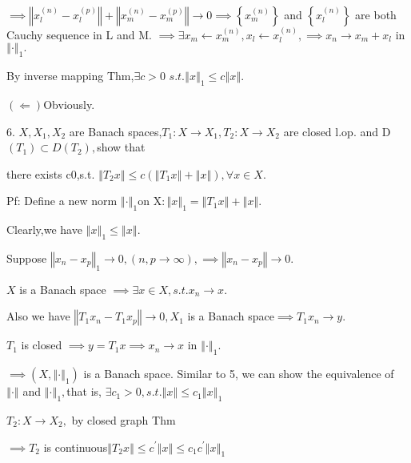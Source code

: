 \documentclass{ctexart}
\begin{document}
$\implies \left\Vert x_{l}^{\left( n\right) }-x_{l}^{\left( p\right)
}\right\Vert +\left\Vert x_{m}^{\left( n\right) }-x_{m}^{\left( p\right)
}\right\Vert \rightarrow 0\implies \left\{ x_{m}^{\left( n\right) }\right\} $
and $\left\{ x_{l}^{\left( n\right) }\right\} $ are both Cauchy sequence in
L and M. $\implies \exists x_{m}\leftarrow x_{m}^{\left( n\right)
},x_{l}\leftarrow x_{l}^{\left( n\right) },\implies x_{n}\rightarrow
x_{m}+x_{l}$ in $\left\Vert \cdot \right\Vert _{1}.$

\bigskip By inverse mapping Thm,$\exists c>0$ $s.t.\left\Vert x\right\Vert
_{1}\leq c\left\Vert x\right\Vert .$

$\left( \Longleftarrow \right) $Obviously.

6. $X,X_{1},X_{2}$ are Banach spaces,$T_{1}:X\rightarrow
X_{1},T_{2}:X\rightarrow X_{2}$ are closed l.op. and D$\left( T_{1}\right)
\subset D\left( T_{2}\right) ,$show that

there exists c\TEXTsymbol{>}0,s.t. $\left\Vert T_{2}x\right\Vert \leq
c\left( \left\Vert T_{1}x\right\Vert +\left\Vert x\right\Vert \right)
,\forall x\in X.$

Pf: Define a new norm $\left\Vert \cdot \right\Vert _{1}$on X$:\left\Vert
x\right\Vert _{1}=\left\Vert T_{1}x\right\Vert +\left\Vert x\right\Vert .$

Clearly,we have $\left\Vert x\right\Vert _{1}\leq \left\Vert x\right\Vert .$

Suppose $\left\Vert x_{n}-x_{p}\right\Vert _{1}\rightarrow 0,\left(
n,p\rightarrow \infty \right) ,\implies \left\Vert x_{n}-x_{p}\right\Vert
\rightarrow 0.$

$X$ is a Banach space $\implies \exists x\in X,s.t.x_{n}\rightarrow x.$

Also we have $\left\Vert T_{1}x_{n}-T_{1}x_{p}\right\Vert \rightarrow
0,X_{1} $ is a Banach space$\implies T_{1}x_{n}\rightarrow y.$

$T_{1}$ is closed $\implies y=T_{1}x\implies x_{n}\rightarrow x$ in $%
\left\Vert \cdot \right\Vert _{1}.$

$\implies \left( X,\left\Vert \cdot \right\Vert _{1}\right) $ is a Banach
space. Similar to 5, we can show the equivalence of $\left\Vert \cdot
\right\Vert $ and $\left\Vert \cdot \right\Vert _{1},$that is, $\exists
c_{1}>0,s.t.\left\Vert x\right\Vert \leq c_{1}\left\Vert x\right\Vert _{1}$

$T_{2}:X\rightarrow X_{2},$ by closed graph Thm

$\implies T_{2}$ is continuous$\left\Vert T_{2}x\right\Vert \leq c^{\prime
}\left\Vert x\right\Vert \leq c_{1}c^{\prime }\left\Vert x\right\Vert _{1}$
\end{document}
